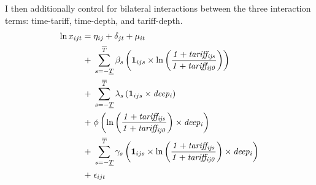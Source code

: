 I then additionally control for bilateral interactions between the three interaction terms: time-tariff, time-depth, and tariff-depth. 
    \begin{align}
        \ln x_{ijt} = \; & \eta_{ij} + \delta_{jt} + \mu_{it} \notag \\
        + \; & \sum_{s = -\underline{T}}^{\overline{T}} \beta_s \left( \mathbf{1}_{ijs} \times \ln \left( \frac{\mathit{1 + tariff_{ijs}}}{\mathit{1 + tariff_{ij0}}} \right) \right) \notag \\
        + \; & \sum_{s = -\underline{T}}^{\overline{T}} \lambda_s \left( \mathbf{1}_{ijs} \times \mathit{deep_{i}} \right) \notag \\
        + \; & \phi \left( \ln \left( \frac{\mathit{1 + tariff_{ijs}}}{\mathit{1 + tariff_{ij0}}} \right) \times \mathit{deep_{i}} \right) \notag \\
        + \; & \sum_{s = -\underline{T}}^{\overline{T}} \gamma_s \left( \mathbf{1}_{ijs} \times \ln \left( \frac{\mathit{1 + tariff_{ijs}}}{\mathit{1 + tariff_{ij0}}} \right) \times \mathit{deep_{i}} \right) \notag \\
        + \; & \epsilon_{ijt}
    \end{align}


